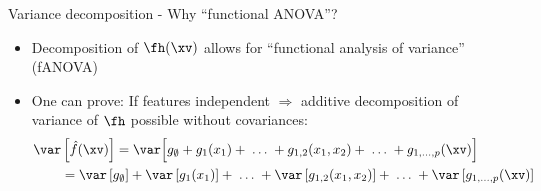 \documentclass[11pt,compress,t,notes=noshow, aspectratio=169, xcolor=table]{beamer}
\newcommand{\open}{}
\newcommand{\close}{}
\begin{document}
\begin{frame}{Variance decomposition - Why ``functional ANOVA''?
}

\begin{itemize}[<+->]
\item Decomposition of $\fh(\xv)$ allows for ``functional analysis of variance'' (fANOVA)
\item One can prove: 
If features independent $\Rightarrow$ additive decomposition of variance of $\fh$ possible without covariances:
\begin{align*}
\var & \left[ \hat{f}(\xv) \right]
 =  \var \Big[g_{\open \emptyset \close} + g_{\open 1 \close}(x_1) + \;\dots\; + g_{\open 1, 2 \close}(x_1, x_2) + \;\dots\; + g_{\open 1,\ldots,p \close}(\xv) \Big] \\
& = \var\left[g_{\open \emptyset \close}\right]
    + \var\left[g_{\open 1 \close}(x_1)\right] + \;\dots\; 
    + \var\left[g_{\open 1, 2 \close}(x_1, x_2)\right] + \;\dots\;
    + \var\left[g_{\open 1,\ldots,p \close}(\xv)\right]
\end{align*}


\end{itemize}
\end{frame}
\end{document}
